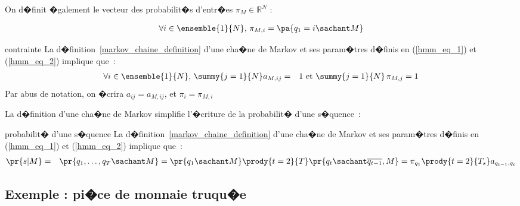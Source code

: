 On d�finit �galement le vecteur des probabilit�s d'entr�es $\pi_M \in \mathbb{R}^N$ :

        \begin{eqnarray}
        \forall i\in \ensemble{1}{N} ,\, \pi_{M,i}=\pa { q_{1}=i \sachant  M }
        \label{hmm_eq_2}
        \end{eqnarray}

            \begin{xproperty}{contrainte}
            \label{propriete_mmc_contrainte_1}%
            La d�finition~\ref{markov_chaine_definition} d'une cha�ne de Markov et ses param�tres d�finis en 
            (\ref{hmm_eq_1}) et (\ref{hmm_eq_2}) implique que~:
                    \begin{eqnarray*}
                    \forall i \in \ensemble{1}{N} , \,\summy{j=1}{N}a_{M,ij}&=&1 \text{ et } \summy{j=1}{N} \,\pi_{M,j} = 1
                    \end{eqnarray*}
            Par abus de notation, on �crira $a_{ij}=a_{M,ij}$, et $\pi_{i}=\pi_{M,i}$
            \end{xproperty}


La d�finition d'une cha�ne de Markov simplifie l'�criture de la probabilit� d'une s�quence~:

        \begin{xproperty}{probabilit� d'une s�quence}
        La d�finition~\ref{markov_chaine_definition} d'une cha�ne de Markov et ses param�tres d�finis en (\ref{hmm_eq_1}) et
             (\ref{hmm_eq_2}) implique que~:
                \begin{eqnarray*}
                \pr{s|M}        &=& \pr{q_1,\dots,q_T \sachant M} = \pr{q_1 \sachant M}\prody{t=2}{T}
                                                                 \pr{q_t \sachant \overline{q_{t-1}},M} 
                                = \pi_{q_1} \prody{t=2}{T_s} a_{q_{t-1},q_t}
                \end{eqnarray*}
        \end{xproperty}









\subsection{Exemple : pi�ce de monnaie truqu�e} \label{chaine_markov_exemple}

%

